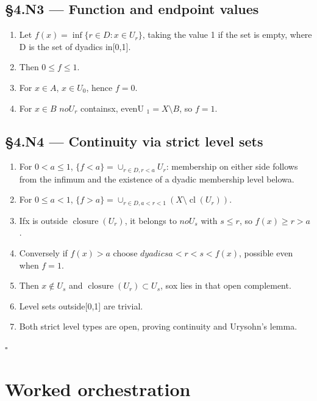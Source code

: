 \documentclass[preprint,12pt,aps,pra,showkeys,amsmath,amssymb,superscriptaddress,floatfix]{revtex4-2}
\theoremstyle{definition}
\theoremstyle{remark}
\begin{document}
\subsection{§4.N3 --- Function and endpoint
values}\label{n3-function-and-endpoint-values}

\begin{enumerate}
\def\labelenumi{\arabic{enumi}.}
\item
  Let \(f(x)=\operatorname{inf} \{r\in D:x\in U_r\}\), taking the value
  1 if the set is empty, where D is the set of dyadics in{[}0,1{]}.
\item
  Then \(0\le f\le 1\).
\item
  For \(x\in A\), \(x\in U_{0}\), hence \(f=0\).
\item
  For \(x\in B\) \(noU_r\) containsx, evenU \(_{1}=X\setminus B\), so
  \(f=1\).
\end{enumerate}

\subsection{§4.N4 --- Continuity via strict level
sets}\label{n4-continuity-via-strict-level-sets}

\begin{enumerate}
\def\labelenumi{\arabic{enumi}.}
\item
  For \(0<a\le 1\), \(\{f<a\}=\cup _{r\in D,r<a}U_r\): membership on
  either side follows from the infimum and the existence of a dyadic
  membership level belowa.
\item
  For \(0\le a<1\),
  \(\{f>a\}=\cup _{r\in D,a<r<1}(X\setminus\operatorname{cl}(U_r))\).
\item
  Ifx is outside \(\operatorname{closure} (U_r)\), it belongs to
  \(noU_s\) with \(s\le r\), so \(f(x)\ge r>a\).
\item
  Conversely if \(f(x)>a\) choose \(dyadicsa<r<s<f(x)\), possible even
  when \(f=1\).
\item
  Then \(x\notin U_s\) and \(\operatorname{closure} (U_r)\subset U_s\),
  sox lies in that open complement.
\item
  Level sets outside{[}0,1{]} are trivial.
\item
  Both strict level types are open, proving continuity and Urysohn's
  lemma.
\end{enumerate}

\hfill$\square$

\section{Worked orchestration}
\end{document}
